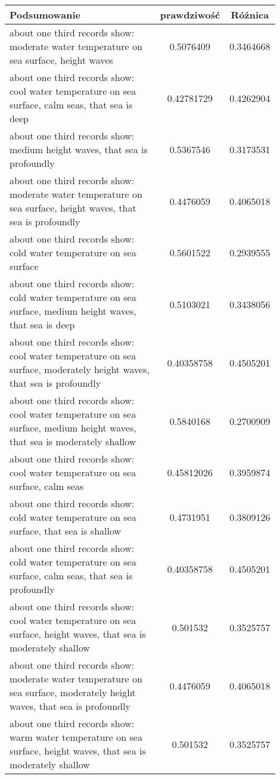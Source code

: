 \documentclass{article}
\begin{document}
\begin{longtable}{|p{0.9\linewidth}|c|c|}
\hline
\textbf{Podsumowanie} & \textbf{prawdziwość} & \textbf{Różnica} \\
\hline
about one third records show: moderate water temperature on sea surface, height waves & 0.5076409 & 0.3464668 \\ \hline
about one third records show: cool water temperature on sea surface, calm seas, that sea is deep & 0.42781729 & 0.4262904 \\ \hline
about one third records show: medium height waves, that sea is profoundly & 0.5367546 & 0.3173531 \\ \hline
about one third records show: moderate water temperature on sea surface, height waves, that sea is profoundly & 0.4476059 & 0.4065018 \\ \hline
about one third records show: cold water temperature on sea surface & 0.5601522 & 0.2939555 \\ \hline
about one third records show: cold water temperature on sea surface, medium height waves, that sea is deep & 0.5103021 & 0.3438056 \\ \hline
about one third records show: cool water temperature on sea surface, moderately height waves, that sea is profoundly & 0.40358758 & 0.4505201 \\ \hline
about one third records show: cool water temperature on sea surface, medium height waves, that sea is moderately shallow & 0.5840168 & 0.2700909 \\ \hline
about one third records show: cool water temperature on sea surface, calm seas & 0.45812026 & 0.3959874 \\ \hline
about one third records show: cold water temperature on sea surface, that sea is shallow & 0.4731951 & 0.3809126 \\ \hline
about one third records show: cold water temperature on sea surface, calm seas, that sea is profoundly & 0.40358758 & 0.4505201 \\ \hline
about one third records show: cool water temperature on sea surface, height waves, that sea is moderately shallow & 0.501532 & 0.3525757 \\ \hline
about one third records show: moderate water temperature on sea surface, moderately height waves, that sea is profoundly & 0.4476059 & 0.4065018 \\ \hline
about one third records show: warm water temperature on sea surface, height waves, that sea is moderately shallow & 0.501532 & 0.3525757 \\ \hline

\end{longtable}
\end{document}
